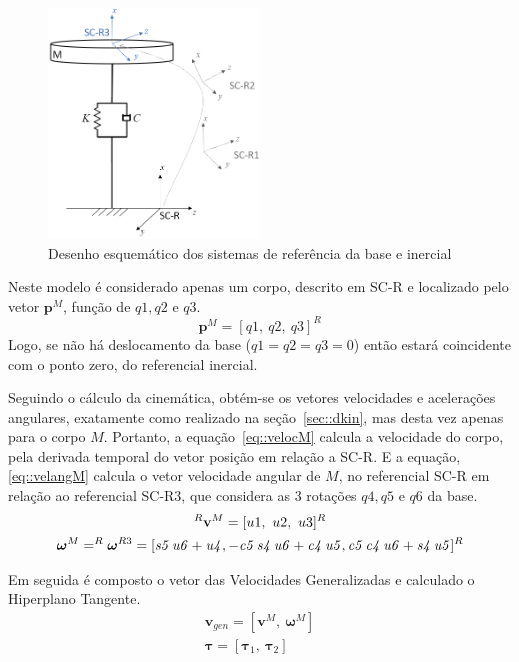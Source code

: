 \begin{figure}[h]
	\centering 
 	\includegraphics[width=0.5\textwidth]{figs/schem_scbase}
 	\caption{Desenho esquemático dos sistemas de referência da base e inercial}
 	\label{fig::schem_scbase}
\end{figure}

Neste modelo é considerado apenas um corpo, descrito em SC-R e localizado pelo
vetor $\mathbf{p}^M$, função de $q1,q2$ e $q3$.
%
\begin{equation}
	\mathbf{p}^M = [q1,~q2,~q3]^R
\end{equation}
%
Logo, se não há deslocamento da base ($q1=q2=q3=0$) então estará coincidente com
o ponto zero, do referencial inercial.

Seguindo o cálculo da cinemática, obtém-se os vetores velocidades e acelerações
angulares, exatamente como realizado na seção~\ref{sec::dkin}, mas desta vez
apenas para o corpo $M$.
Portanto, a equação~\ref{eq::velocM} calcula a velocidade do corpo, pela
derivada temporal do vetor posição em relação a SC-R. E a equação,
\ref{eq::velangM} calcula o vetor velocidade angular de $M$, no referencial SC-R
em relação ao referencial SC-R3, que considera as 3 rotações $q4, q5$ e $q6$ da
base.
%
\begin{gather} 
	^{R}\mathbf{v}^{M} = [u1,~u2,~u3]^R \label{eq::velocM} \\
	\boldsymbol{\omega}^{M} = ^{R}\boldsymbol{\omega}^{R3} = [{\it s5}\,{\it
	u6}+{\it u4},-{\it c5}\,{\it s4}\,{\it u6}+{\it c4}\,{ \it u5},{\it c5}\,{\it c4}\,{\it u6}+{\it s4}\,{\it u5}]^{R}
\label{eq::velangM}
\end{gather}
%

Em seguida é composto o vetor das Velocidades Generalizadas e calculado o
Hiperplano Tangente.
%
\begin{gather}
	\mathbf{v}_{gen} = [ \mathbf{v}^{M},~ \boldsymbol{\omega}^{M}] \\
	\boldsymbol{\tau} = [\boldsymbol{\tau}_1,~ \boldsymbol{\tau}_2]
\end{gather}
%

